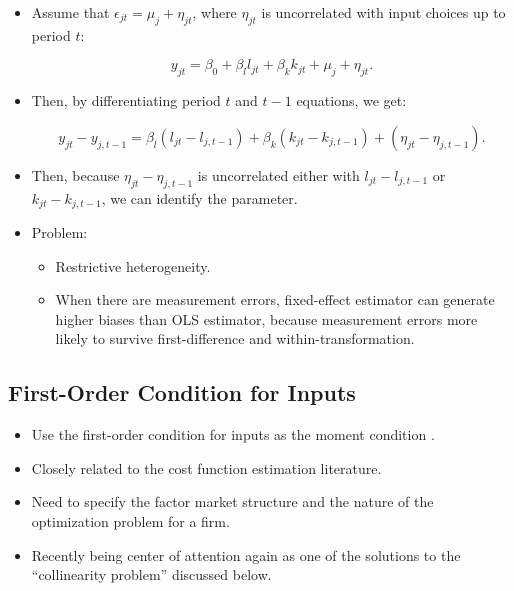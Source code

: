 \documentclass[]{book}
\providecommand{\tightlist}{%
  \setlength{\itemsep}{0pt}\setlength{\parskip}{0pt}}
\begin{document}
\begin{itemize}
\tightlist
\item
  Assume that \(\epsilon_{jt} = \mu_j + \eta_{jt}\), where \(\eta_{jt}\)
  is uncorrelated with input choices up to period \(t\):

  \begin{equation}
  y_{jt} = \beta_0 + \beta_l l_{jt} + \beta_k k_{jt} + \mu_j + \eta_{jt}.
  \end{equation}
\item
  Then, by differentiating period \(t\) and \(t - 1\) equations, we get:

  \begin{equation}
  y_{jt} - y_{j, t - 1}= \beta_l (l_{jt} - l_{j, t - 1}) + \beta_k (k_{jt} - k_{j, t - 1}) + (\eta_{jt} - \eta_{j, t - 1}).
  \end{equation}
\item
  Then, because \(\eta_{jt} - \eta_{j, t - 1}\) is uncorrelated either
  with \(l_{jt} - l_{j, t - 1}\) or \(k_{jt} - k_{j, t - 1}\), we can
  identify the parameter.
\item
  Problem:

  \begin{itemize}
  \tightlist
  \item
    Restrictive heterogeneity.
  \item
    When there are measurement errors, fixed-effect estimator can
    generate higher biases than OLS estimator, because measurement
    errors more likely to survive first-difference and
    within-transformation.
  \end{itemize}
\end{itemize}

\subsection{First-Order Condition for
Inputs}\label{first-order-condition-for-inputs}

\begin{itemize}
\tightlist
\item
  Use the first-order condition for inputs as the moment condition
  \citep{McElroy1987}.
\item
  Closely related to the cost function estimation literature.
\item
  Need to specify the factor market structure and the nature of the
  optimization problem for a firm.
\item
  Recently being center of attention again as one of the solutions to
  the ``collinearity problem'' discussed below.
\end{itemize}
\end{document}

